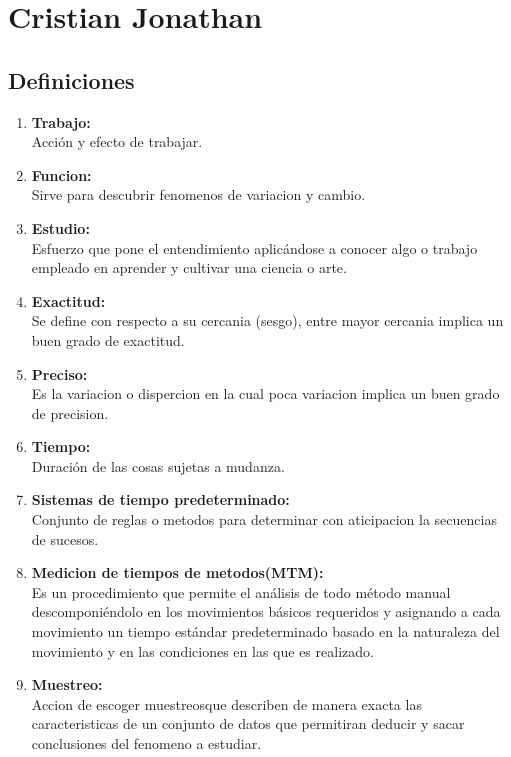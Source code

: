 \section{Cristian Jonathan}
\subsection{Definiciones}

\begin{enumerate}

    \item \textbf {Trabajo:}
    \\Acción y efecto de trabajar.
    

 
 
    \item  \textbf {Funcion: }
    \\Sirve para descubrir fenomenos de variacion y cambio.
    \item \textbf  {Estudio: }
    \\Esfuerzo que pone el entendimiento aplicándose a conocer algo o   trabajo empleado en aprender y cultivar una ciencia o arte.
    
    \item  \textbf {Exactitud: }
    \\Se define con respecto a su cercania (sesgo), entre mayor cercania implica un buen grado de exactitud.  
    
    \item  \textbf {Preciso: }
    \\Es la variacion o dispercion en la cual poca variacion implica un buen grado de precision.
    
    
    \item \textbf  {Tiempo:}
    \\Duración de las cosas sujetas a mudanza.
    \item  \textbf {Sistemas de tiempo predeterminado:}
    \\Conjunto de reglas o metodos para determinar con aticipacion la secuencias de sucesos.
    \item \textbf { Medicion de tiempos de metodos(MTM):}
    \\Es un procedimiento que permite el análisis de todo método manual descomponiéndolo en los movimientos básicos requeridos y asignando a cada movimiento un tiempo estándar predeterminado basado en la naturaleza del movimiento y en las condiciones en las que es realizado.
    \item  \textbf {Muestreo: }
    \\Accion de escoger muestreosque describen de manera exacta las caracteristicas de un conjunto de datos que permitiran deducir y sacar conclusiones del fenomeno a estudiar.
  

\end{enumerate}

